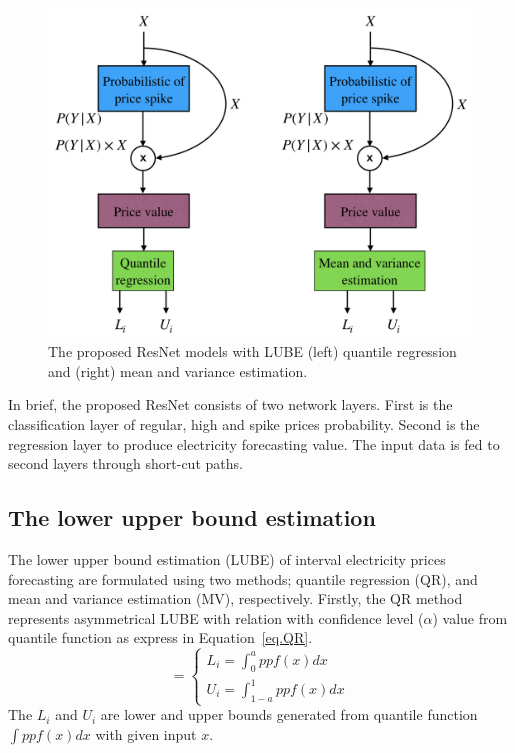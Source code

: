 \documentclass[review]{elsarticle}
\begin{document}
      \begin{figure}[H]
        \includegraphics[width=12cm]{UB_LB_MV_PDRNN}
        \caption{The proposed ResNet models with LUBE (left) quantile regression and (right) mean and variance estimation.}
        \label{Fig:UB_LB_MV_PDRNN}
        \centering
      \end{figure}

      In brief, the proposed ResNet consists of two network layers.
      First is the classification layer of regular, high and spike prices probability.
      Second is the regression layer to produce electricity forecasting value.
      The input data is fed to second layers through short-cut paths.

    \subsection{The lower upper bound estimation}
      The lower upper bound estimation (LUBE) of interval electricity prices forecasting are formulated using two methods; quantile regression (QR), and mean and variance estimation (MV), respectively.
      Firstly, the QR method represents asymmetrical LUBE with relation with confidence level ($\alpha$) value from quantile function as express in Equation~\ref{eq.QR}.
      \begin{equation}
        [L_{i}, U_{i}]=
        \begin{cases}
        L_{i}=\int_{0}^{a} ppf(x) dx\\
        U_{i}=\int_{1-a}^{1} ppf(x) dx
        \end{cases}
        \label{eq.QR}
      \end{equation}
      The $L_{i}$ and $U_{i}$ are lower and upper bounds generated from quantile function $\int ppf(x) dx$ with given input $x$.
\end{document}
